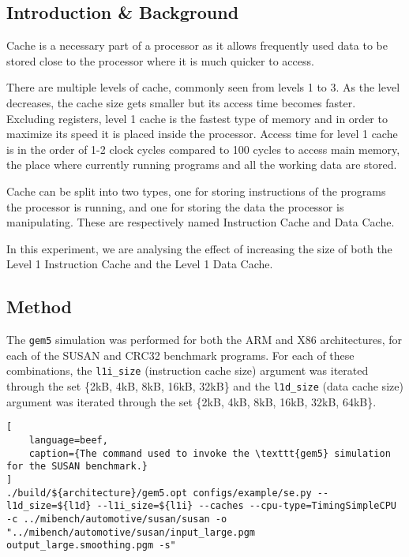 
\subsection{Introduction \& Background}

Cache is a necessary part of a processor as it allows frequently used data to be stored
close to the processor where it is much quicker to access.

There are multiple levels of cache, commonly seen from levels 1 to 3.
As the level decreases, the cache size gets smaller but its access time becomes faster.
Excluding registers, level 1 cache is the fastest type of memory and in order to maximize
its speed it is placed inside the processor.
Access time for level 1 cache is in the order of 1-2 clock cycles compared to 100 cycles
to access main memory, the place where currently running programs and all the working
data are stored.

Cache can be split into two types, one for storing instructions of the programs the
processor is running, and one for storing the data the processor is manipulating.
These are respectively named Instruction Cache and Data Cache.

In this experiment, we are analysing the effect of increasing the size of both the
Level 1 Instruction Cache and the Level 1 Data Cache.

\subsection{Method}

The \texttt{gem5} simulation was performed for both the ARM and X86 architectures, for
each of the SUSAN and CRC32 benchmark programs.
For each of these combinations, the \texttt{l1i\_size} (instruction cache size) argument was
iterated through the set \{2kB, 4kB, 8kB, 16kB, 32kB\} and the \texttt{l1d\_size} (data cache size)
argument was iterated through the set \{2kB, 4kB, 8kB, 16kB, 32kB, 64kB\}.

\begin{lstlisting}[
    language=beef,
    caption={The command used to invoke the \texttt{gem5} simulation for the SUSAN benchmark.}
]
./build/${architecture}/gem5.opt configs/example/se.py --l1d_size=${l1d} --l1i_size=${l1i} --caches --cpu-type=TimingSimpleCPU -c ../mibench/automotive/susan/susan -o "../mibench/automotive/susan/input_large.pgm output_large.smoothing.pgm -s"
\end{lstlisting}

